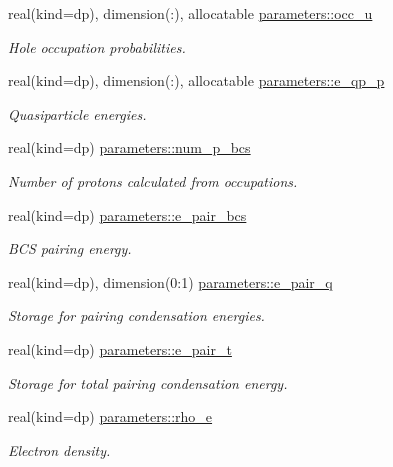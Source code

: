 \begin{DoxyCompactItemize}
real(kind=dp), dimension(\+:), allocatable \mbox{\hyperlink{group__PAIRING_ga705a97e5d2ac10a6facfe20757a6bbd4}{parameters\+::occ\+\_\+u}}
\begin{DoxyCompactList}\small\item\em Hole occupation probabilities. \end{DoxyCompactList}\item 
real(kind=dp), dimension(\+:), allocatable \mbox{\hyperlink{group__PAIRING_ga19d67e5b89ebd51642f7ef33a88d5cb2}{parameters\+::e\+\_\+qp\+\_\+p}}
\begin{DoxyCompactList}\small\item\em Quasiparticle energies. \end{DoxyCompactList}\item 
real(kind=dp) \mbox{\hyperlink{group__PAIRING_gaedb771510f7d66badb70bbe3e2ad28c2}{parameters\+::num\+\_\+p\+\_\+bcs}}
\begin{DoxyCompactList}\small\item\em Number of protons calculated from occupations. \end{DoxyCompactList}\item 
real(kind=dp) \mbox{\hyperlink{group__PAIRING_gae25457a2576ddbfa6a0c4bda3f4f7f58}{parameters\+::e\+\_\+pair\+\_\+bcs}}
\begin{DoxyCompactList}\small\item\em B\+CS pairing energy. \end{DoxyCompactList}\item 
real(kind=dp), dimension(0\+:1) \mbox{\hyperlink{group__PAIRING_ga9bc3597a7161607a24ef358150c703b1}{parameters\+::e\+\_\+pair\+\_\+q}}
\begin{DoxyCompactList}\small\item\em Storage for pairing condensation energies. \end{DoxyCompactList}\item 
real(kind=dp) \mbox{\hyperlink{group__PAIRING_ga7791448dd4d929ad8528cfb98b9f984b}{parameters\+::e\+\_\+pair\+\_\+t}}
\begin{DoxyCompactList}\small\item\em Storage for total pairing condensation energy. \end{DoxyCompactList}\item 
real(kind=dp) \mbox{\hyperlink{group__ELECTRONS_ga395bd413249aeecf9cdbad4ff0740d03}{parameters\+::rho\+\_\+e}}
\begin{DoxyCompactList}\small\item\em Electron density. \end{DoxyCompactList}\item 

\end{DoxyCompactItemize}
